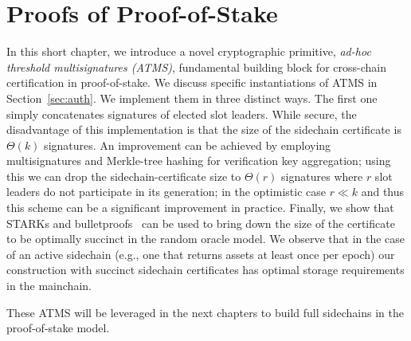 \chapter{Proofs of Proof-of-Stake}\label{chapter:stake}

In this short chapter,
we introduce a novel cryptographic primitive,
\emph{ad-hoc threshold multisignatures (ATMS)},
 fundamental building block for cross-chain certification in proof-of-stake.
We discuss specific instantiations of ATMS in
Section~\ref{sec:auth}.
We implement them in three distinct ways. The first one simply concatenates
signatures of elected slot leaders. While secure, the disadvantage of this
implementation is that the size of the sidechain certificate is $\Theta(k)$
signatures. An improvement can be achieved by employing multisignatures and
Merkle-tree hashing for verification key aggregation;  using this we can drop
the sidechain-certificate size to $\Theta(r)$ signatures where $r$  slot leaders
do not participate in its generation; in the optimistic case $r\ll k$ and thus
this scheme can be a significant improvement in practice. Finally, we show that
STARKs and bulletproofs~\cite{ben2017scalable,bulletproofs} can be used to bring
down the size of the certificate to be optimally succinct in the random oracle
model.  We observe that in the case of an active sidechain (e.g., one that
returns assets at least once per epoch) our construction with succinct sidechain
certificates has optimal storage requirements in the mainchain.

These ATMS will be leveraged in the next chapters to build full sidechains in
the proof-of-stake model.




